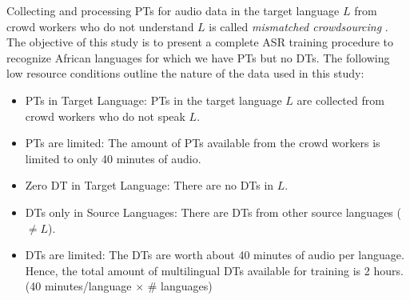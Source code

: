 \documentclass[a4paper]{article}
\begin{document}
Collecting and processing PTs for audio data in the target language $L$ from crowd workers who do not understand $L$ is called \emph{mismatched crowdsourcing} \cite{Jyothi-MismatchedCrowdsourcingTrans}. %
The objective of this study is to present a complete ASR training procedure to recognize African languages for which we have PTs but no DTs. The following low resource conditions outline the nature of the data used in this study:  \vspace{-1mm}
\begin{itemize}[leftmargin=*]
\item PTs in Target Language: PTs in the target language $L$ are collected from crowd workers who do not speak $L$. \vspace{-1.5mm}
\item PTs are limited: The amount of PTs available from the crowd workers is limited to only 40 minutes of audio.  \vspace{-1mm}
\item Zero DT in Target Language: There are no DTs in $L$.  \vspace{-1mm}
\item DTs only in Source Languages: There are DTs from other source languages ($\ne L$).  \vspace{-1mm}
\item DTs are limited: The DTs are worth about 40 minutes of audio per language. Hence, the total amount of multilingual DTs available for training is 2 hours. (40 minutes/language $\times$ \# languages)  \vspace{-1mm}
\end{itemize}
\end{document}
